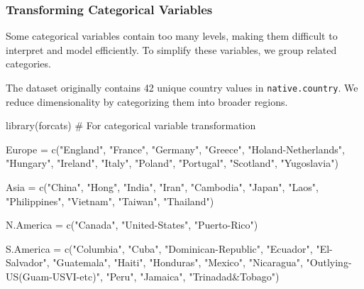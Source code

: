 \documentclass[
  11pt,
]{book}
\makeatletter
\newenvironment{Shaded}{}{}
\newcommand{\CommentTok}[1]{\textcolor[rgb]{0.36,0.36,0.36}{#1}}
\newcommand{\FunctionTok}[1]{#1}
\newcommand{\NormalTok}[1]{#1}
\newcommand{\OtherTok}[1]{\textcolor[rgb]{0.39,0.39,0.39}{#1}}
\newcommand{\StringTok}[1]{\textcolor[rgb]{0.39,0.39,0.39}{#1}}
\newenvironment{kframe}{%
\medskip{}
\setlength{\fboxsep}{.8em}
 \def\at@end@of@kframe{}%
 \ifinner\ifhmode%
  \def\at@end@of@kframe{\end{minipage}}%
  \begin{minipage}{\columnwidth}%
 \fi\fi%
 \def\FrameCommand##1{\hskip\@totalleftmargin \hskip-\fboxsep
 \colorbox{shadecolor}{##1}\hskip-\fboxsep
     \hskip-\linewidth \hskip-\@totalleftmargin \hskip\columnwidth}%
 \MakeFramed {\advance\hsize-\width
   \@totalleftmargin\z@ \linewidth\hsize
   \@setminipage}}%
 {\par\unskip\endMakeFramed%
 \at@end@of@kframe}
\renewenvironment{Shaded}{\begin{kframe}}{\end{kframe}}
\theoremstyle{definition}
\theoremstyle{definition}
\theoremstyle{definition}
\theoremstyle{definition}
\theoremstyle{remark}
\makeatother
\begin{document}
\subsubsection*{Transforming Categorical Variables}\label{transforming-categorical-variables}


Some categorical variables contain too many levels, making them difficult to interpret and model efficiently. To simplify these variables, we group related categories.

The dataset originally contains 42 unique country values in \texttt{native.country}. We reduce dimensionality by categorizing them into broader regions.

\begin{Shaded}
\begin{Highlighting}[]
\FunctionTok{library}\NormalTok{(forcats)  }\CommentTok{\# For categorical variable transformation}

\NormalTok{Europe }\OtherTok{=} \FunctionTok{c}\NormalTok{(}\StringTok{"England"}\NormalTok{, }\StringTok{"France"}\NormalTok{, }\StringTok{"Germany"}\NormalTok{, }\StringTok{"Greece"}\NormalTok{, }\StringTok{"Holand{-}Netherlands"}\NormalTok{, }\StringTok{"Hungary"}\NormalTok{, }
           \StringTok{"Ireland"}\NormalTok{, }\StringTok{"Italy"}\NormalTok{, }\StringTok{"Poland"}\NormalTok{, }\StringTok{"Portugal"}\NormalTok{, }\StringTok{"Scotland"}\NormalTok{, }\StringTok{"Yugoslavia"}\NormalTok{)}

\NormalTok{Asia }\OtherTok{=} \FunctionTok{c}\NormalTok{(}\StringTok{"China"}\NormalTok{, }\StringTok{"Hong"}\NormalTok{, }\StringTok{"India"}\NormalTok{, }\StringTok{"Iran"}\NormalTok{, }\StringTok{"Cambodia"}\NormalTok{, }\StringTok{"Japan"}\NormalTok{, }\StringTok{"Laos"}\NormalTok{, }
         \StringTok{"Philippines"}\NormalTok{, }\StringTok{"Vietnam"}\NormalTok{, }\StringTok{"Taiwan"}\NormalTok{, }\StringTok{"Thailand"}\NormalTok{)}

\NormalTok{N.America }\OtherTok{=} \FunctionTok{c}\NormalTok{(}\StringTok{"Canada"}\NormalTok{, }\StringTok{"United{-}States"}\NormalTok{, }\StringTok{"Puerto{-}Rico"}\NormalTok{)}

\NormalTok{S.America }\OtherTok{=} \FunctionTok{c}\NormalTok{(}\StringTok{"Columbia"}\NormalTok{, }\StringTok{"Cuba"}\NormalTok{, }\StringTok{"Dominican{-}Republic"}\NormalTok{, }\StringTok{"Ecuador"}\NormalTok{, }\StringTok{"El{-}Salvador"}\NormalTok{, }
              \StringTok{"Guatemala"}\NormalTok{, }\StringTok{"Haiti"}\NormalTok{, }\StringTok{"Honduras"}\NormalTok{, }\StringTok{"Mexico"}\NormalTok{, }\StringTok{"Nicaragua"}\NormalTok{, }
              \StringTok{"Outlying{-}US(Guam{-}USVI{-}etc)"}\NormalTok{, }\StringTok{"Peru"}\NormalTok{, }\StringTok{"Jamaica"}\NormalTok{, }\StringTok{"Trinadad\&Tobago"}\NormalTok{)}


\end{Highlighting}
\end{Shaded}
\end{document}
